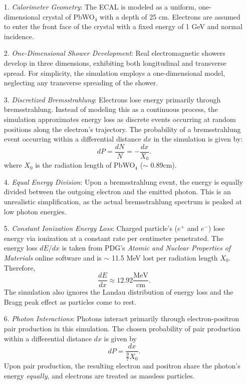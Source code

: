 \documentclass[twocolumn]{aastex631}
\begin{document}
\begin{itemize}
    \item[1.] \textit{Calorimeter Geometry}: The ECAL is modeled as a uniform,
        one-dimensional crystal of PbWO$_\text{4}$  with a depth of 25 cm. Electrons are
        assumed to enter the front face of the crystal with a fixed energy of 1
        GeV and normal incidence.
    \item[2.] \textit{One-Dimensional Shower Development}: Real electromagnetic
        showers develop in three dimensions, exhibiting both longitudinal and
        transverse spread. For simplicity, the simulation employs a
        one-dimensional model, neglecting any transverse spreading of the
        shower. 
    \item[3.] \textit{Discretized Bremsstrahlung}: Electrons lose energy
        primarily through bremsstrahlung. Instead of modeling this as a
        continuous process, the simulation approximates energy loss as discrete
        events occurring at random positions along the electron’s trajectory.
        The probability of a bremsstrahlung event occurring within a
        differential distance $dx$ in the simulation is given by: 
        \[ dP = \frac{dN}{N} = -\frac{dx}{X_0}. \] where $X_0$ is the radiation
        length of PbWO$_\text{4}$ ($\sim$ 0.89cm).  
    \item[4.] \textit{Equal Energy Division}: Upon a bremsstrahlung event, the
        energy is equally divided between the outgoing electron and the emitted
        photon. This is an unrealistic simplification, as the actual
        bremsstrahlung spectrum is peaked at low photon energies.
    \item[5.] \textit{Constant Ionization Energy Loss}: Charged particle's
        ($e^+$ and  $e^-$) lose energy via ionization at a constant rate per
        centimeter penetrated. The energy loss  $dE/dx$ is taken from PDG's
        \textit{Atomic and Nuclear Properties of Materials} online software and
        is $\sim$ 11.5 MeV lost per radiation length  $X_0$. Therefore, 
        \[ \frac{dE}{dx} \approx 12.92 \frac{\text{MeV}}{\text{cm}}. \]  
        The simulation also ignores the Landau distribution of energy loss and
        the Bragg peak effect as particles come to rest. 
    \item[6.] \textit{Photon Interactions}: Photons interact primarily through
        electron-positron pair production in this simulation. The chosen
        probability of pair production within a differential distance $dx$ is
        given by 
        \[ dP = \frac{dx}{\frac{9}{7}X_0}. \]
        Upon pair production, the resulting electron and positron share the
        photon's energy \textit{equally}, and electrons are treated as massless
        particles. 
\end{itemize}
\end{document}
